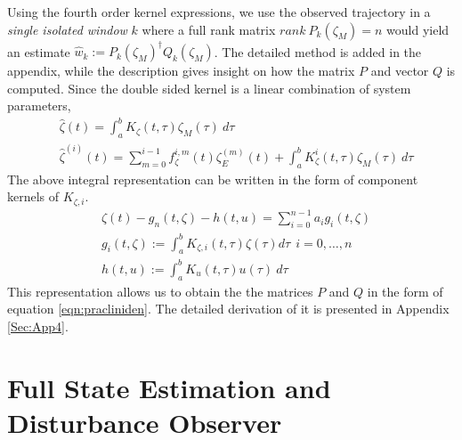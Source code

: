 \documentclass[letterpaper%
, twoside%
, 12pt%
,memoire%
, english%
,creativecommons,hyperref%
]{thETS}
\theoremstyle{newThmStyle}
\begin{document}
Using the fourth order kernel expressions, we use the observed trajectory in a {\it single isolated window} $k$ where a full rank matrix $rank \ P_k(\zeta_M) =n$ would yield an estimate $\hat{w}_k := P_k(\zeta_M)^\dagger Q_k(\zeta_M)$. The detailed method is added in the appendix, while the description gives insight on how the matrix $P$ and vector $Q$ is computed. Since the double sided kernel is a linear combination of system parameters, 
\begin{align} \label{eqn:evalEST} 
& \hat{\zeta}(t) = \int_a^b K_{\zeta}(t,\tau) \zeta_M(\tau) \ d \tau \\
& \hat{\zeta}^{(i)}(t) = \sum_{m=0}^{i-1} f_\zeta^{i,m}(t) \zeta_E^{(m)}(t) + \int_a^b K_{\zeta}^{i} (t,\tau) \zeta_M(\tau) \ d \tau 
\end{align}
The above integral representation can be written in the form of component kernels of $K_{\zeta,i}$.
\begin{align}
& \zeta(t) - g_n(t, \zeta) -h(t,u) = \sum_{i=0}^{n-1} a_i  g_i (t, \zeta)  \label{eq:est1} \\
&  g_i( t, \zeta) := \int_a^b K_{\zeta,i} (t,\tau) \zeta(\tau) d \tau  \ \ i = 0, \dots, n \label{rep3} \\
& h(t,u) := \int_a^b K_{u}(t,\tau) u(\tau) \ d \tau \nonumber
\end{align}
This representation allows us to obtain the the matrices $P$ and $Q$ in the form of equation \eqref{eqn:pracliniden}. The detailed derivation of it is presented in Appendix \ref{Sec:App4}.


\section{Full State Estimation and Disturbance Observer} \label{Sec:FullStateEst}
\end{document}
